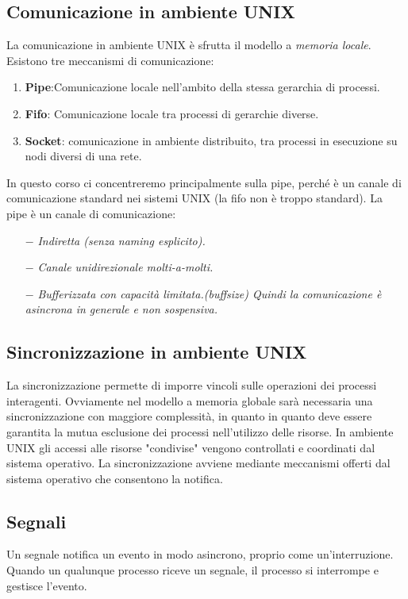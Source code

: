 \documentclass{article}
\begin{document}
\subsection{Comunicazione in ambiente UNIX}
\noindent La comunicazione in ambiente UNIX è sfrutta il modello
a \textit{memoria locale}.
Esistono tre meccanismi di comunicazione:
\begin{enumerate}
    \item \textbf{Pipe}:Comunicazione locale nell'ambito della 
    stessa gerarchia di processi.
    \item \textbf{Fifo}: Comunicazione locale tra processi di 
    gerarchie diverse.
    \item \textbf{Socket}: comunicazione in ambiente distribuito,
    tra processi in esecuzione su nodi diversi di una rete.
\end{enumerate}

In questo corso ci concentreremo principalmente sulla pipe, perché
è un canale di comunicazione standard nei sistemi UNIX (la fifo non è troppo standard).
La pipe è un canale di comunicazione:
\begin{itemize}
    \item[$-$] \textit{Indiretta (senza naming esplicito).}
    \item [$-$] \textit{Canale unidirezionale molti-a-molti.}
    \item [$-$] \textit{Bufferizzata con capacità limitata.(buffsize)
    Quindi la comunicazione è asincrona in generale e non sospensiva.}
\end{itemize}

\subsection{Sincronizzazione in ambiente UNIX}
La sincronizzazione permette di imporre vincoli sulle operazioni
dei processi interagenti. Ovviamente nel modello a memoria globale
sarà necessaria una sincronizzazione con maggiore complessità, in quanto
in quanto deve essere garantita la mutua esclusione dei processi nell'utilizzo
delle risorse.
In ambiente UNIX gli accessi alle risorse "condivise" vengono
controllati e coordinati dal sistema operativo. La sincronizzazione
avviene mediante meccanismi offerti dal sistema operativo che consentono la
notifica.

\subsection{Segnali}
Un segnale notifica un evento in modo asincrono, proprio come 
un'interruzione. Quando un qualunque processo riceve un segnale,
il processo si interrompe e gestisce l'evento.
\end{document}
